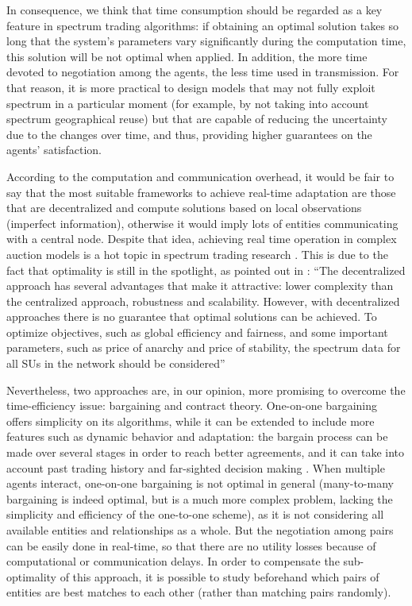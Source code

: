 In consequence, we think that time consumption should be regarded as a key feature in spectrum trading algorithms: if obtaining an optimal solution takes so long that the system's parameters vary significantly during the computation time, this solution will be not optimal when applied.
In addition, the more time devoted to negotiation among the agents, the less time used in transmission. 
For that reason, it is more practical to design models that may not fully exploit spectrum in a particular moment (for example, by not taking into account spectrum geographical reuse) but that are capable of reducing the uncertainty due to the changes over time, and thus, providing higher guarantees on the agents' satisfaction. 

According to the computation and communication overhead, it would be fair to say that the most suitable frameworks to achieve real-time adaptation are those that are decentralized and compute solutions based on local observations (imperfect information), otherwise it would imply lots of entities communicating with a central node. 
Despite that idea, achieving real time operation in complex auction models is a hot topic in spectrum trading research \cite{ref:Vidal2013,ref:Kim2013,ref:Xu2012}. 
This is due to the fact that optimality is still in the spotlight, as pointed out in \cite{ref:Vidal2013}: ``The decentralized approach has several advantages that make it attractive: lower complexity than the centralized approach, robustness and scalability. 
However, with decentralized approaches there is no guarantee that optimal solutions can be achieved. 
To optimize objectives, such as global efficiency and fairness, and some important parameters, such as price of anarchy and price of stability, the spectrum data for all SUs in the network should be considered''

Nevertheless, two approaches are, in our opinion, more promising to overcome the time-efficiency issue: bargaining and contract theory. 
One-on-one bargaining offers simplicity on its algorithms, while it can be extended to include more features such as dynamic behavior and adaptation: the bargain process can be made over several stages in order to reach better agreements, and it can take into account past trading history and far-sighted decision making \cite{ref:Yan2011}. 
When multiple agents interact, one-on-one bargaining is not optimal in general (many-to-many bargaining is indeed optimal, but is a much more complex problem, lacking the simplicity and efficiency of the one-to-one scheme), as it is not considering all available entities and relationships as a whole. 
But the negotiation among pairs can be easily done in real-time, so that there are no utility losses because of computational or communication delays. 
In order to compensate the sub-optimality of this approach, it is possible to study beforehand which pairs of entities are best matches to each other (rather than matching pairs randomly).
  

